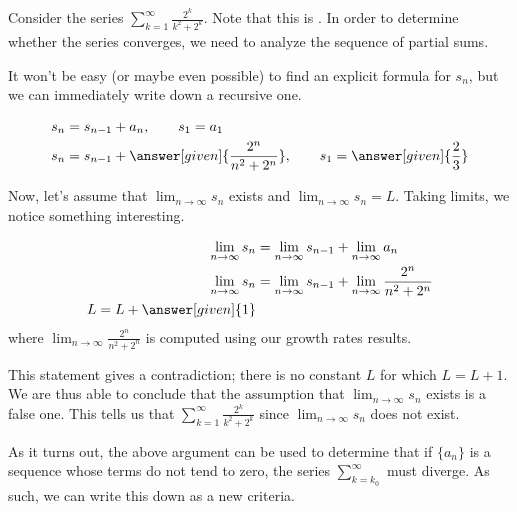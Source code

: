 \documentclass{ximera}
\begin{document}
\begin{example}
Consider the series $\sum_{k=1}^{\infty} \frac{2^k}{k^2+2^k}$.  Note that this is .  In order to determine whether the series converges, we need to analyze the sequence of partial sums.  

It won't be easy (or maybe even possible) to find an explicit formula for $s_n$, but we can immediately write down a recursive one.

\begin{align*}
s_n &= s_{n-1}+a_n, \qquad s_1 = a_1 \\
s_n &= s_{n-1} + \answer[given]{\frac{2^n}{n^2+2^n}}, \qquad s_1 = \answer[given]{\frac{2}{3}}
\end{align*}

Now, let's assume that $\lim_{n \to \infty} s_n$ exists and $\lim_{n \to \infty} s_n =L$.  Taking limits, we notice something interesting.

\begin{align*}
\lim_{n \to \infty} s_n &= \lim_{n \to \infty} s_{n-1}+ \lim_{n \to \infty} a_n \\
\lim_{n \to \infty} s_n &= \lim_{n \to \infty} s_{n-1} +\lim_{n \to \infty} \frac{2^n}{n^2+2^n} \\
L = L + \answer[given]{1}
\end{align*}
where $\lim_{n \to \infty} \frac{2^n}{n^2+2^n}$ is computed using our growth rates results.

This statement gives a contradiction; there is no constant $L$ for which $L=L+1$.  We are thus able to conclude that the assumption that $\lim_{n \to \infty} s_n$ exists is a false one.  This tells us that $\sum_{k=1}^{\infty} \frac{2^k}{k^2+2^k}$  since $\lim_{n \to \infty} s_n$ does not exist.
\end{example}

As it turns out, the above argument can be used to determine that if $\{a_n\}$ is a sequence whose terms do not tend to zero, the series $\sum_{k=k_0}^{\infty}$ must diverge.  As such, we can write this down as a new criteria.
\end{document}
